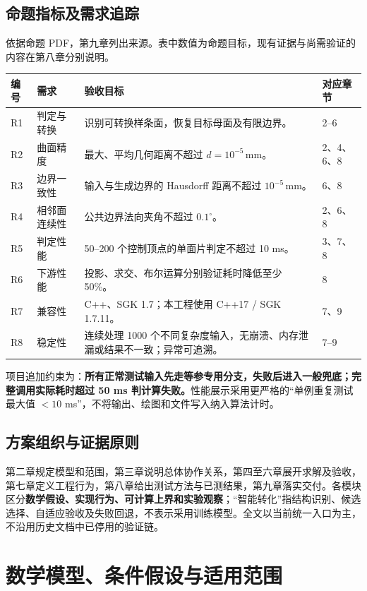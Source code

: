 \documentclass[UTF8,zihao=5,fontset=windows,a4paper]{ctexart}
\begin{document}
\subsection{命题指标及需求追踪}
依据命题 PDF，第九章列出来源。表中数值为命题目标，现有证据与尚需验证的内容在第八章分别说明。
\begin{center}\small\renewcommand{\arraystretch}{1.19}
\begin{tabularx}{\linewidth}{@{}p{10mm}p{23mm}Yp{18mm}@{}}\toprule
编号 & 需求 & 验收目标 & 对应章节\\\midrule
R1 & 判定与转换 & 识别可转换样条面，恢复目标母面及有限边界。 & 2--6\\
R2 & 曲面精度 & 最大、平均几何距离不超过 $d=10^{-5}\,\mathrm{mm}$。 & 2、4、6、8\\
R3 & 边界一致性 & 输入与生成边界的 Hausdorff 距离不超过 $10^{-5}\,\mathrm{mm}$。 & 6、8\\
R4 & 相邻面连续性 & 公共边界法向夹角不超过 $0.1^\circ$。 & 2、6、8\\
R5 & 判定性能 & 50--200 个控制顶点的单面片判定不超过 10 ms。 & 3、7、8\\
R6 & 下游性能 & 投影、求交、布尔运算分别验证耗时降低至少 50\%。 & 8\\
R7 & 兼容性 & C++、SGK 1.7；本工程使用 C++17 / SGK 1.7.11。 & 7、9\\
R8 & 稳定性 & 连续处理 1000 个不同复杂度输入，无崩溃、内存泄漏或结果不一致；异常可追溯。 & 7--9\\\bottomrule
\end{tabularx}
\end{center}
项目追加约束为：\textbf{所有正常测试输入先走等参专用分支，失败后进入一般兜底；完整调用实际耗时超过 50 ms 判计算失败。}性能展示采用更严格的“单例重复测试最大值 $<10$ ms”，不将输出、绘图和文件写入纳入算法计时。

\subsection{方案组织与证据原则}
第二章规定模型和范围，第三章说明总体协作关系，第四至六章展开求解及验收，第七章定义工程行为，第八章给出测试方法与已测结果，第九章落实交付。各模块区分\textbf{数学假设、实现行为、可计算上界和实验观察}；“智能转化”指结构识别、候选选择、自适应验收及失败回退，不表示采用训练模型。全文以当前统一入口为主，不沿用历史文档中已停用的验证链。

\newpage
\section{数学模型、条件假设与适用范围}
\end{document}
